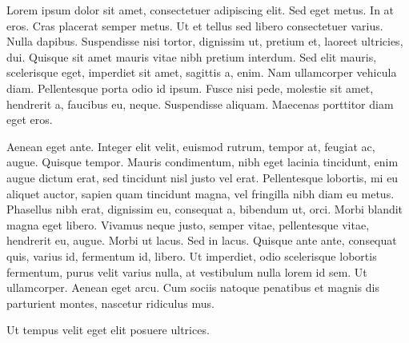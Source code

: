 \documentclass[a4paper,draft]{article}
\begin{document}
\nocite{test-booklet}
Lorem ipsum dolor sit amet, consectetuer adipiscing elit.
Sed eget metus. In at eros. Cras placerat semper metus.
Ut et tellus sed libero consectetuer varius. Nulla dapibus.
Suspendisse nisi tortor, dignissim ut, pretium et, laoreet
ultricies, dui. Quisque sit amet mauris vitae nibh pretium
interdum. Sed elit mauris, scelerisque eget, imperdiet sit
amet, sagittis a, enim. Nam ullamcorper vehicula diam.
Pellentesque porta odio id ipsum. Fusce nisi pede, molestie
sit amet, hendrerit a, faucibus eu, neque. Suspendisse
aliquam. \cite{viktorov-metodoj}
Maecenas porttitor diam eget eros.

Aenean eget ante. Integer elit velit, euismod rutrum, tempor
at, feugiat ac, augue. Quisque tempor. Mauris condimentum,
nibh eget lacinia tincidunt, enim augue dictum erat, sed
tincidunt nisl justo vel erat. Pellentesque lobortis, mi eu
aliquet auctor, sapien quam tincidunt magna, vel fringilla
nibh diam eu metus. Phasellus nibh erat, dignissim eu,
consequat a, bibendum ut, orci. Morbi blandit magna eget
libero. \cite{ruckenstein-diffusion} Vivamus neque justo, semper vitae, pellentesque
vitae, hendrerit eu, augue. Morbi ut lacus. Sed in lacus.
Quisque ante ante, consequat quis, varius id, fermentum id,
libero. Ut imperdiet, odio scelerisque lobortis fermentum,
purus velit varius nulla, at vestibulum nulla lorem id sem.
Ut ullamcorper. Aenean eget arcu. Cum sociis natoque penatibus
et magnis dis parturient montes, nascetur ridiculus mus.

Ut tempus velit eget elit posuere ultrices.


\end{document}
